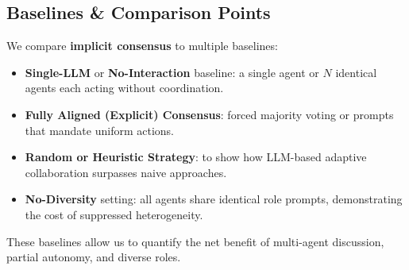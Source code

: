 \subsection{Baselines \& Comparison Points}
\label{ssec:baselines}
We compare \textbf{implicit consensus} to multiple baselines:
\begin{itemize}[itemsep=1pt, parsep=1pt, leftmargin=*]
    \item \textbf{Single-LLM} or \textbf{No-Interaction} baseline: a single agent or $N$ identical agents each acting without coordination.
    \item \textbf{Fully Aligned (Explicit) Consensus}: forced majority voting or prompts that mandate uniform actions.
    \item \textbf{Random or Heuristic Strategy}: to show how LLM-based adaptive collaboration surpasses naive approaches.
    \item \textbf{No-Diversity} setting: all agents share identical role prompts, demonstrating the cost of suppressed heterogeneity.
\end{itemize}
These baselines allow us to quantify the net benefit of multi-agent discussion, partial autonomy, and diverse roles.
